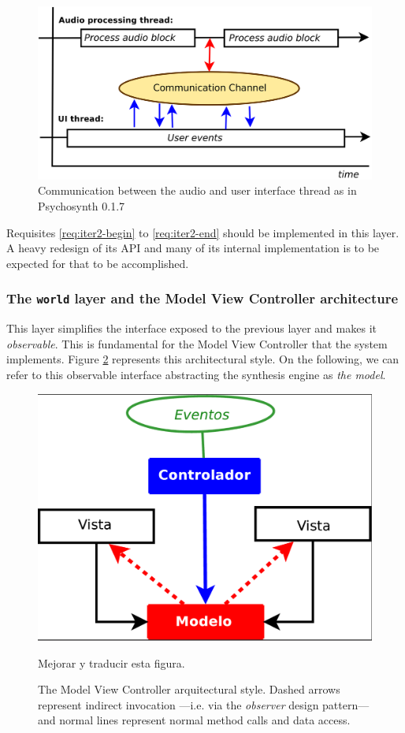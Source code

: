 \begin{figure}[h]
\centering
\includegraphics[width=.7\textwidth]{pic/thread.png}
\caption{Communication between the audio and user interface thread as
  in Psychosynth 0.1.7}
\label{fig:thread}
\end{figure}

Requisites \ref{req:iter2-begin} to \ref{req:iter2-end} should be
implemented in this layer. A heavy redesign of its API and many of its
internal implementation is to be expected for that to be accomplished.

\subsubsection{The \texttt{world} layer and the Model View Controller
  architecture}

This layer simplifies the interface exposed to the previous layer and
makes it \emph{observable}. This is fundamental for the Model View
Controller that the system implements.  Figure \ref{fig:mvc}
represents this architectural style. On the following, we can refer to
this observable interface abstracting the synthesis engine as
\emph{the model}.

\begin{figure}[h!] \centering
\includegraphics[width=.5\textwidth]{pic/mvc.png}
\begin{todo}
Mejorar y traducir esta figura.
\end{todo}
\caption[The MVC architectural style]{The Model View Controller
  arquitectural style. Dashed arrows represent indirect invocation
  ---i.e. via the \emph{observer} design pattern--- and normal lines
  represent normal method calls and data access.}
\label{fig:mvc}
\end{figure}

